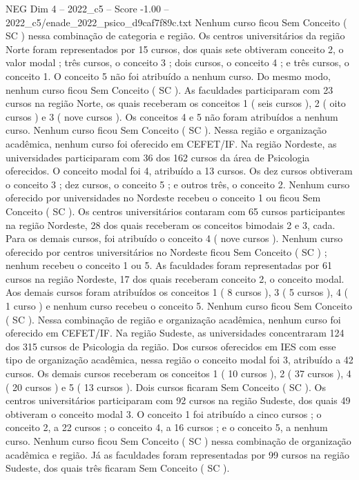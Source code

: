 \begin{textsample}{NEG Dim 4 – 2022\_c5 – Score -1.00 – 2022\_c5/enade\_2022\_psico\_d9caf7f89c.txt}
Nenhum curso ficou Sem Conceito ( SC ) nessa combinação de categoria e região.
Os centros universitários da região Norte foram representados por 15 cursos, dos quais sete obtiveram conceito 2, o valor modal ; três cursos, o conceito 3 ; dois cursos, o conceito 4 ; e três cursos, o conceito 1.
O conceito 5 não foi atribuído a nenhum curso.
Do mesmo modo, nenhum curso ficou Sem Conceito ( SC ).
As faculdades participaram com 23 cursos na região Norte, os quais receberam os conceitos 1 ( seis cursos ), 2 ( oito cursos ) e 3 ( nove cursos ).
Os conceitos 4 e 5 não foram atribuídos a nenhum curso.
Nenhum curso ficou Sem Conceito ( SC ).
Nessa região e organização acadêmica, nenhum curso foi oferecido em CEFET/IF.
Na região Nordeste, as universidades participaram com 36 dos 162 cursos da área de Psicologia oferecidos.
O conceito modal foi 4, atribuído a 13 cursos.
Os dez cursos obtiveram o conceito 3 ; dez cursos, o conceito 5 ; e outros três, o conceito 2.
Nenhum curso oferecido por universidades no Nordeste recebeu o conceito 1 ou ficou Sem Conceito ( SC ).
Os centros universitários contaram com 65 cursos participantes na região Nordeste, 28 dos quais receberam os conceitos bimodais 2 e 3, cada.
Para os demais cursos, foi atribuído o conceito 4 ( nove cursos ).
Nenhum curso oferecido por centros universitários no Nordeste ficou Sem Conceito ( SC ) ; nenhum recebeu o conceito 1 ou 5.
As faculdades foram representadas por 61 cursos na região Nordeste, 17 dos quais receberam conceito 2, o conceito modal.
Aos demais cursos foram atribuídos os conceitos 1 ( 8 cursos ), 3 ( 5 cursos ), 4 ( 1 curso ) e nenhum curso recebeu o conceito 5.
Nenhum curso ficou Sem Conceito ( SC ).
Nessa combinação de região e organização acadêmica, nenhum curso foi oferecido em CEFET/IF.
Na região Sudeste, as universidades concentraram 124 dos 315 cursos de Psicologia da região.
Dos cursos oferecidos em IES com esse tipo de organização acadêmica, nessa região o conceito modal foi 3, atribuído a 42 cursos.
Os demais cursos receberam os conceitos 1 ( 10 cursos ), 2 ( 37 cursos ), 4 ( 20 cursos ) e 5 ( 13 cursos ).
Dois cursos ficaram Sem Conceito ( SC ).
Os centros universitários participaram com 92 cursos na região Sudeste, dos quais 49 obtiveram o conceito modal 3.
O conceito 1 foi atribuído a cinco cursos ; o conceito 2, a 22 cursos ; o conceito 4, a 16 cursos ; e o conceito 5, a nenhum curso.
Nenhum curso ficou Sem Conceito ( SC ) nessa combinação de organização acadêmica e região.
Já as faculdades foram representadas por 99 cursos na região Sudeste, dos quais três ficaram Sem Conceito ( SC ).

\end{textsample}
